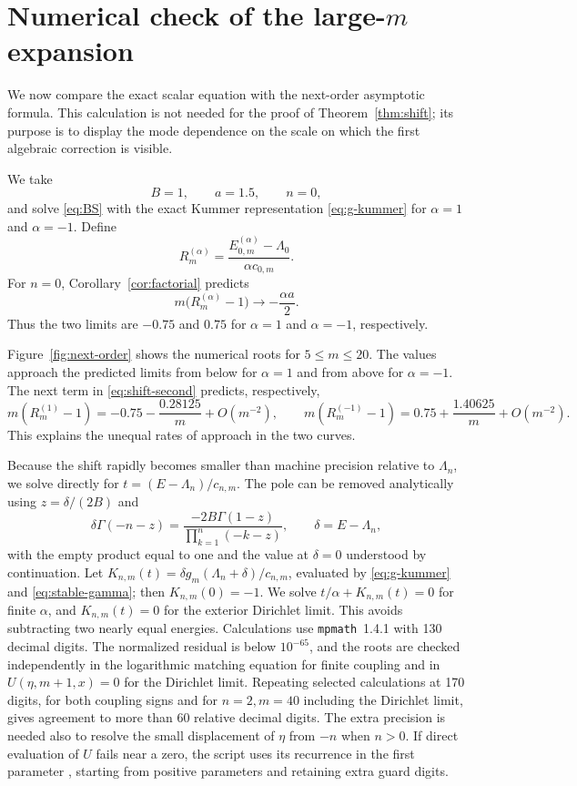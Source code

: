 \documentclass[12pt,a4paper]{article}
\numberwithin{equation}{section}
\theoremstyle{remark}
\theoremstyle{definition}
\begin{document}
\section{Numerical check of the large-$m$ expansion}\label{sec:numerics}

We now compare the exact scalar equation with the next-order asymptotic formula.
This calculation is not needed for the proof of Theorem~\ref{thm:shift}; its
purpose is to display the mode dependence on the scale on which the first
algebraic correction is visible.

We take
$$
B=1,\qquad a=1.5,\qquad n=0,
$$
and solve \eqref{eq:BS} with the exact Kummer representation
\eqref{eq:g-kummer} for $\alpha=1$ and $\alpha=-1$.  Define
\begin{equation}\label{eq:Rdef}
R_m^{(\alpha)}
=\frac{E_{0,m}^{(\alpha)}-\Lambda_0}{\alpha c_{0,m}}.
\end{equation}
For $n=0$, Corollary~\ref{cor:factorial} predicts
$$
m\bigl(R_m^{(\alpha)}-1\bigr)
\longrightarrow -\frac{\alpha a}{2}.
$$
Thus the two limits are $-0.75$ and $0.75$ for $\alpha=1$ and $\alpha=-1$,
respectively.

Figure~\ref{fig:next-order} shows the numerical roots for $5\le m\le20$.
The values approach the predicted limits from below for $\alpha=1$ and
from above for $\alpha=-1$. The next term in \eqref{eq:shift-second}
predicts, respectively,
$$
m(R_m^{(1)}-1)=-0.75-\frac{0.28125}{m}+O(m^{-2}),
\qquad
m(R_m^{(-1)}-1)=0.75+\frac{1.40625}{m}+O(m^{-2}).
$$
This explains the unequal rates of approach in the two curves.

Because the shift rapidly becomes smaller than machine precision relative
to $\Lambda_n$, we solve directly for $t=(E-\Lambda_n)/c_{n,m}$.
The pole can be removed analytically using $z=\delta/(2B)$ and
\begin{equation}\label{eq:stable-gamma}
\delta\Gamma(-n-z)
=\frac{-2B\Gamma(1-z)}{\prod_{k=1}^n(-k-z)},
\qquad \delta=E-\Lambda_n,
\end{equation}
with the empty product equal to one and the value at $\delta=0$
understood by continuation. Let
$K_{n,m}(t)=\delta g_m(\Lambda_n+\delta)/c_{n,m}$, evaluated by
\eqref{eq:g-kummer} and \eqref{eq:stable-gamma}; then $K_{n,m}(0)=-1$.
We solve $t/\alpha+K_{n,m}(t)=0$ for finite $\alpha$, and
$K_{n,m}(t)=0$ for the exterior Dirichlet limit. This avoids subtracting
two nearly equal energies. Calculations use \texttt{mpmath}~1.4.1 with
130 decimal digits. The normalized residual is below $10^{-65}$, and the
roots are checked independently in the logarithmic matching equation for
finite coupling and in $U(\eta,m+1,x)=0$ for the Dirichlet limit.
Repeating selected calculations at 170 digits, for both coupling signs
and for $n=2,m=40$ including the Dirichlet limit, gives agreement to more
than 60 relative decimal digits. The extra precision is needed also to
resolve the small displacement of $\eta$ from $-n$ when $n>0$.
If direct evaluation of $U$ fails near a zero, the script uses its
recurrence in the first parameter \cite[Eq.~13.3.7]{DLMF}, starting
from positive parameters and retaining extra guard digits.
\end{document}

